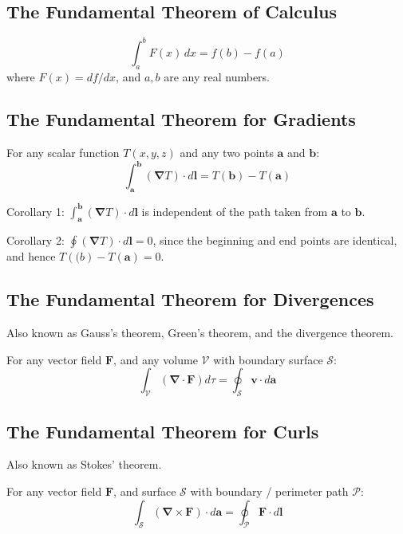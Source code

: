 \documentclass[a4paper]{article}
\theoremstyle{plain}
\theoremstyle{definition}
\newcommand{\vect}[1]{\textbf{#1}}
\newcommand{\del}{\bm{\nabla}}
\begin{document}
\subsection{The Fundamental Theorem of Calculus}

\begin{equation}
\int_{a}^{b} F(x) \,dx = f(b) - f(a)
\end{equation}
where $F(x) = df/dx$, and $a,b$ are any real numbers.

\subsection{The Fundamental Theorem for Gradients}
\label{sec:ftocgrad}

For any scalar function $T(x,y,z)$ and any two points $\vect{a}$ and
$\vect{b}$:
\begin{equation}
\int_{\vect{a}}^{\vect{b}} (\del T) \cdot d\vect{l} = T(\vect{b}) - T(\vect{a})
\end{equation}

Corollary 1: $\int_{\vect{a}}^{\vect{b}} (\del T) \cdot d\vect{l}$ is
independent of the path taken from $\vect{a}$ to $\vect{b}$.

Corollary 2: $\oint (\del T) \cdot d\vect{l} = 0$, since the beginning
and end points are identical, and hence $T(\vect(b) - T(\vect{a}) =
0$.

\subsection{The Fundamental Theorem for Divergences}

Also known as Gauss's theorem, Green's theorem, and the divergence
theorem.

For any vector field $\vect{F}$, and any volume $\mathcal{V}$ with
boundary surface $\mathcal{S}$:
\begin{equation}
\int_{\mathcal{V}} (\del \cdot \vect{F}) d\tau = \oint_{\mathcal{S}} \vect{v} \cdot d\vect{a}
\end{equation}

\subsection{The Fundamental Theorem for Curls}
\label{sec:stokesthm}

Also known as Stokes' theorem.

For any vector field $\vect{F}$, and surface $\mathcal{S}$ with
boundary / perimeter path $\mathcal{P}$:
\begin{equation}
\int_{\mathcal{S}} (\del \times \vect{F}) \cdot d\vect{a} = \oint_{\mathcal{P}} \vect{F} \cdot d\vect{l}
\end{equation}
\end{document}
